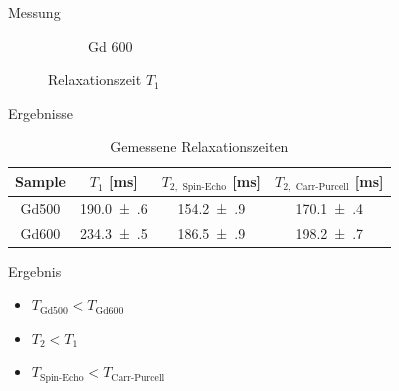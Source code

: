\begin{frame}{Messung}
\begin{figure}
\begin{subfigure}{.49\textwidth}
		\caption{Gd 600}
		\end{subfigure}
	\caption{Relaxationszeit $T_1$}
	\end{figure}
\end{frame}
%
%
\begin{frame}{Ergebnisse}
	\begin{table}
	\centering
	\begin{tabular}{cccc}
	\toprule
	Sample & $T_1$ [ms] & $T_{2,\text{ Spin-Echo}}$ [ms] & $T_{2,\text{ Carr-Purcell}}$ [ms]\\
	\midrule
	Gd500 & \num{190.0(6)} & \num{154.2(9)} & \num{170.1(4)}\\
	Gd600 & \num{234.3(5)} & \num{186.5(9)} & \num{198.2(7)}\\
	\bottomrule
	\end{tabular}
	\caption{Gemessene Relaxationszeiten}
	\end{table}
	\begin{block}{Ergebnis}
	\begin{itemize}
	\item $T_\text{Gd500} < T_\text{Gd600}$
	\item $T_2 < T_1$
	\item $T_\text{Spin-Echo} < T_\text{Carr-Purcell}$
	\end{itemize}
	\end{block}
\end{frame}
%
%
%
%
